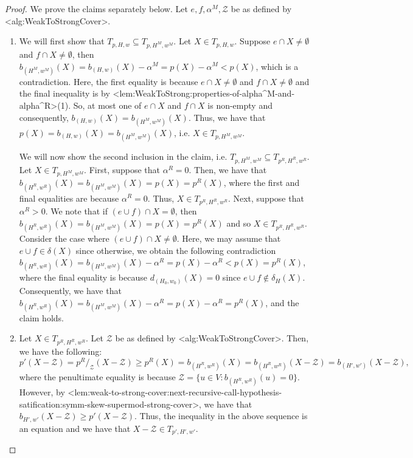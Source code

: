 \documentclass{article}
\def\Cref#1{<#1>}%
\newcommand{\zeros}{\ensuremath{\mathcal{Z}}\xspace}
\newcommand{\tightSetFamily}[1]{\ensuremath{T_{#1}}\xspace}
\newcommand{\functionContract}[2]{\ensuremath{{#1}/_{#2}}\xspace}
\begin{document}
\begin{proof} We prove the claims separately below. Let $e, f, \alpha^M, \zeros$ be as defined by \Cref{alg:WeakToStrongCover}.
\begin{enumerate}
    \item We will first show that $\tightSetFamily{p, H, w} \subseteq \tightSetFamily{p, H^M, w^M}$. Let $X \in \tightSetFamily{p, H, w}$. 
    Suppose $e\cap X\neq \emptyset$ and $f\cap X\neq \emptyset$, then 
        $b_{(H^M, w^M)}(X) = b_{(H,w)}(X) - \alpha^M = p(X) - \alpha^M < p(X)$, which is a contradiction. Here, the first equality is because $e\cap X\neq \emptyset$ and $f\cap X\neq \emptyset$ and the final inequality is by \Cref{lem:WeakToStrong:properties-of-alpha^M-and-alpha^R}(1). 
        So, at most one of $e\cap X$ and $f\cap X$ is non-empty and consequently, $b_{(H,w)}(X)=b_{(H^M, w^M)}(X)$. 
        Thus, we have that $p(X) = b_{(H,w)}(X) = b_{(H^M, w^M)}(X)$, i.e. $X \in \tightSetFamily{p, H^M, w^M}$. 

        We will now show the second inclusion in the claim, i.e. $\tightSetFamily{p, H^M, w^M} \subseteq \tightSetFamily{p^R, H^R, w^R}$. Let $X \in \tightSetFamily{p, H^M, w^M} $. First, suppose that $\alpha^R = 0$. Then, we have that $b_{(H^R, w^R)}(X) = b_{(H^M, w^M)}(X) = p(X) = p^R(X)$, where the first and final equalities are because $\alpha^R = 0$. Thus, $X \in \tightSetFamily{p^R, H^R, w^R}$. Next, suppose that $\alpha^R > 0$. We note that if $(e\cup f) \cap X = \emptyset$, then $b_{(H^R,w^R)}(X) = b_{(H^M,w^M)}(X) = p(X) = p^R(X)$ and so $X \in \tightSetFamily{p^R, H^R, w^R}$. Consider the case where $(e\cup f) \cap X \not = \emptyset$. Here, we may assume that 
        $e\cup f\in \delta(X)$ since otherwise, 
        we obtain the following contradiction  $b_{(H^R, w^R)}(X) = b_{(H^M, w^M)}(X) - \alpha^R = p(X) - \alpha^R < p(X) = p^R(X)$, where the final equality is because $d_{(H_0, w_0)}(X) = 0$ since $e\cup f \not \in \delta_H(X)$. 
        Consequently, we have that $b_{(H^R, w^R)}(X) = b_{(H^M, w^M)}(X) - \alpha^R = p(X) - \alpha^R = p^R(X)$, and the claim holds. 
        
        \item Let $X \in \tightSetFamily{p^R, H^R, w^R}$.  Let $\zeros$ be as defined by \Cref{alg:WeakToStrongCover}. Then, we have the following:
        $$p'(X - \zeros) = \functionContract{p^R}{\zeros}(X - \zeros) \geq p^R(X) = b_{(H^R, w^R)}(X) = b_{(H^R, w^R)}(X - \zeros) = b_{(H', w')}(X - \zeros),$$
        where the penultimate equality is because $\zeros = \{u \in V : b_{(H^R, w^R)}(u) = 0\}$. However, by \Cref{lem:weak-to-strong-cover:next-recursive-call-hypothesis-satification:symm-skew-supermod-strong-cover}, we have that $b_{H',w'}(X - \zeros) \geq p'(X - \zeros)$. Thus, the inequality in the above sequence is an equation and we have that $X - \zeros \in \tightSetFamily{p', H', w'}$.
\end{enumerate}
\end{proof}
\end{document}
